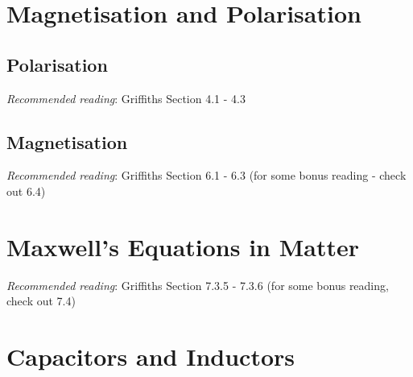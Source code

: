\documentclass[
  letterpaper,
  DIV=11,
  numbers=noendperiod]{scrreprt}
\begin{document}
\chapter{Magnetisation and
Polarisation}\label{magnetisation-and-polarisation}

\newcommand{\l}{\mathrm{\mathbf{l}}}
\newcommand{\E}{\mathrm{\mathbf{E}}}
\newcommand{\F}{\mathrm{\mathbf{F}}}
\newcommand{\r}{\mathrm{\mathbf{r}}}

\newcommand{\x}{\mathrm{\mathbf{x}}}
\newcommand{\y}{\mathrm{\mathbf{y}}}
\newcommand{\z}{\mathrm{\mathbf{z}}}

\section{Polarisation}\label{polarisation}

\emph{Recommended reading}: Griffiths Section 4.1 - 4.3

\section{Magnetisation}\label{magnetisation}

\emph{Recommended reading}: Griffiths Section 6.1 - 6.3 (for some bonus
reading - check out 6.4)


\chapter{Maxwell's Equations in
Matter}\label{maxwells-equations-in-matter}

\newcommand{\l}{\mathrm{\mathbf{l}}}
\newcommand{\E}{\mathrm{\mathbf{E}}}
\newcommand{\F}{\mathrm{\mathbf{F}}}
\newcommand{\r}{\mathrm{\mathbf{r}}}

\newcommand{\x}{\mathrm{\mathbf{x}}}
\newcommand{\y}{\mathrm{\mathbf{y}}}
\newcommand{\z}{\mathrm{\mathbf{z}}}

\emph{Recommended reading}: Griffiths Section 7.3.5 - 7.3.6 (for some
bonus reading, check out 7.4)


\chapter{Capacitors and Inductors}\label{capacitors-and-inductors}

\newcommand{\l}{\mathrm{\mathbf{l}}}
\newcommand{\E}{\mathrm{\mathbf{E}}}
\newcommand{\F}{\mathrm{\mathbf{F}}}
\newcommand{\r}{\mathrm{\mathbf{r}}}
\end{document}
